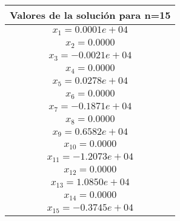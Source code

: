 \documentclass{udpreport}
\begin{document}
\begin{enumerate}
\begin{enumerate}
        \begin{table}[H]
        \centering
            \begin{tabular} { |c|}
            
            \hline
            Valores de la solución para n=15 \\
            \hline
            $x_{1}= 0.0001e+04$\\
            \hline
            $x_{2}=  0.0000$\\
            \hline
            $x_{3}=  -0.0021e+04$\\
            \hline
            $x_{4}=  0.0000$\\
            \hline
            $x_{5}=  0.0278e+04$\\
            \hline
            $x_{6}=  0.0000$\\
            \hline
            $x_{7}=  -0.1871e+04$\\
            \hline
            $x_{8}=   0.0000$\\
            \hline
            $x_{9}=  0.6582e+04$\\
            \hline
            $x_{10}= 0.0000$\\
            \hline
            $x_{11}= -1.2073e+04$\\
            \hline
            $x_{12}= 0.0000$\\
            \hline
            $x_{13}= 1.0850e+04$\\
            \hline
            $x_{14}= 0.0000$\\
            \hline
            $x_{15}= -0.3745e+04$\\
            \hline
            \end{tabular}
        \end{table}
        
        \begin{table}[H]
        \centering
            \begin{tabular} {|c|}
            

\end{tabular}
\end{table}
\end{enumerate}
\end{enumerate}
\end{document}
